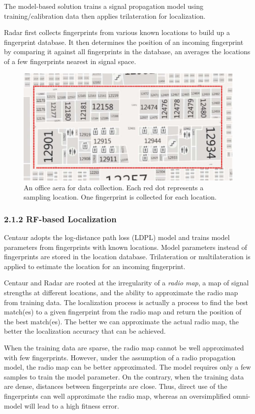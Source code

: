\documentclass[a4paper, 11pt]{article} %
\begin{document}
The model-based solution trains a signal propagation model using training/calibration data then applies trilateration for localization. 

Radar first collects fingerprints from various known locations to build up a fingerprint database. It then determines the position of an incoming fingerprint by comparing it against all fingerprints in the database, an averages the locations of a few fingerprints nearest in signal space.

\begin{figure}[h]
	\centering 
	\includegraphics[width=0.8\linewidth]{Figure1.jpg}
	\caption{An office aera for data collection. Each red dot represents a sampling location. One fingerprint is collected for each location.\cite{Modellet14}}
	\label{fig:subfig}
\end{figure}

\subsubsection*{2.1.2 RF-based Localization \cite{Centaur12}}
Centaur adopts the log-distance path loss (LDPL) model and trains model parameters from fingerprints with known locations. Model parameters instead of fingerprints are stored in the location database. Trilateration or multilateration is applied to estimate the location for an incoming fingerprint.

Centaur and Radar are rooted at the irregularity of a \emph{radio map}, a map of signal strengths at different locations, and the ability to approximate the radio map from training data. The localization process is actually a process to find the best match(es) to a given fingerprint from the radio map and return the position of the best match(es). The better we can approximate the actual radio map, the better the localization accuracy that can be achieved.

When the training data are sparse, the radio map cannot be well approximated with few fingerprints. However, under the assumption of a radio propagation model, the radio map can be better approximated. The model requires only a few samples to train the model parameter. On the contrary, when the training data are dense, distances between fingerprints are close. Thus, direct use of the fingerprints can well approximate the radio map, whereas an oversimplified omni-model will lead to a high fitness error.\cite{Modellet14}
\end{document}
